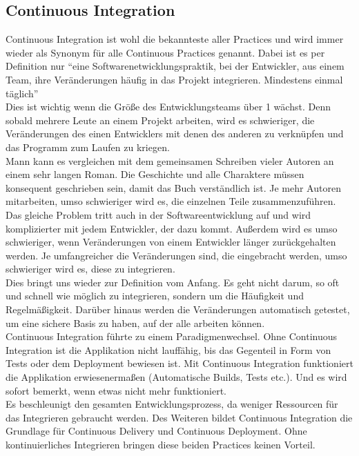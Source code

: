 \subsection{Continuous Integration}
Continuous Integration ist wohl die bekannteste aller Practices und wird immer wieder als Synonym für alle Continuous Practices genannt.\autocite[Vgl.][S.12]{Stahl.2018} Dabei ist es per Definition nur \enquote{eine Softwarenetwicklungspraktik, bei der Entwickler, aus einem Team, ihre Veränderungen häufig in das Projekt integrieren. Mindestens einmal täglich}\autocite[S.12]{Stahl.2018}\\
Dies ist wichtig wenn die Größe des Entwicklungsteams über 1 wächst. Denn sobald mehrere Leute an einem Projekt arbeiten, wird es schwieriger, die Veränderungen des einen Entwicklers mit denen des anderen zu verknüpfen und das Programm zum Laufen zu kriegen.\autocite[Vgl.][S.4]{Stahl.2018}\\ Mann kann es vergleichen mit dem gemeinsamen Schreiben vieler Autoren an einem sehr langen Roman. Die Geschichte und alle Charaktere müssen konsequent geschrieben sein, damit das Buch verständlich ist. Je mehr Autoren mitarbeiten, umso schwieriger wird es, die einzelnen Teile zusammenzuführen.\\ Das gleiche Problem tritt auch in der Softwareentwicklung auf und wird komplizierter mit jedem Entwickler, der dazu kommt. Außerdem wird es umso schwieriger, wenn Veränderungen von einem Entwickler länger zurückgehalten werden. Je umfangreicher die Veränderungen sind, die eingebracht werden, umso schwieriger wird es, diese zu integrieren.\\ Dies bringt uns wieder zur Definition vom Anfang. Es geht nicht darum, so oft und schnell wie möglich zu integrieren, sondern um die Häufigkeit und Regelmäßigkeit.\autocite[Vgl.][S.3]{Stahl.2018} Darüber hinaus werden die Veränderungen automatisch getestet, um eine sichere Basis zu haben, auf der alle arbeiten können.\\ Continuous Integration führte zu einem Paradigmenwechsel. Ohne Continuous Integration ist die Applikation nicht lauffähig, bis das Gegenteil in Form von Tests oder dem Deployment bewiesen ist. Mit Continuous Integration funktioniert die Applikation erwiesenermaßen (Automatische Builds, Tests etc.). Und es wird sofort bemerkt, wenn etwas nicht mehr funktioniert.\autocite[Vgl.][S.40]{Farley.2010}\\ Es beschleunigt den gesamten Entwicklungsprozess, da weniger Ressourcen für das Integrieren gebraucht werden. Des Weiteren bildet Continuous Integration die Grundlage für Continuous Delivery und Continuous Deployment. Ohne kontinuierliches Integrieren bringen diese beiden Practices keinen Vorteil.
